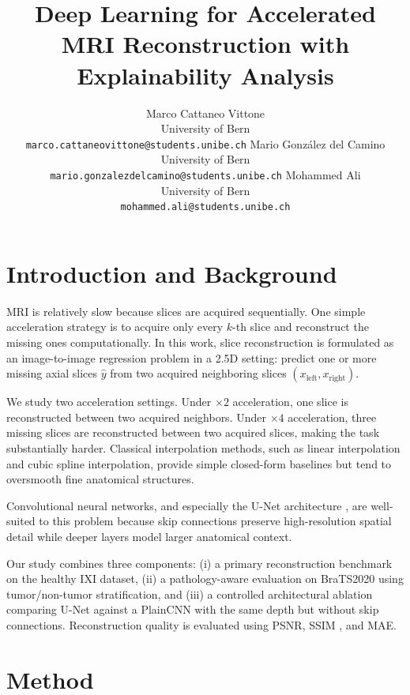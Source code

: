 \documentclass{article}
\title{Deep Learning for Accelerated MRI Reconstruction with Explainability Analysis}
\author{
  Marco Cattaneo Vittone \\
  University of Bern \\
  \texttt{marco.cattaneovittone@students.unibe.ch}
  \And
  Mario González del Camino \\
  University of Bern \\
  \texttt{mario.gonzalezdelcamino@students.unibe.ch}
  \And
  Mohammed Ali \\
  University of Bern \\
  \texttt{mohammed.ali@students.unibe.ch}
}
\begin{document}
\maketitle

\vspace{0.5em}
\section{Introduction and Background}

MRI is relatively slow because slices are acquired sequentially. One simple
acceleration strategy is to acquire only every \(k\)-th slice and reconstruct
the missing ones computationally. In this work, slice reconstruction is formulated as an image-to-image regression problem in a 2.5D setting: predict one or more missing axial slices \(\hat{y}\) from two acquired neighboring slices \((x_{\text{left}}, x_{\text{right}})\).

We study two acceleration settings. Under \( \times 2 \) acceleration, one slice is reconstructed between two acquired neighbors. Under \( \times 4 \) acceleration, three missing slices are reconstructed between two acquired slices, making the task substantially harder. Classical interpolation methods, such as linear interpolation and cubic spline interpolation, provide simple closed-form baselines but tend to oversmooth fine anatomical structures. 

Convolutional neural networks, and especially the U-Net architecture \cite{ronneberger2015unet}, are well-suited to this problem because skip connections preserve high-resolution spatial detail while deeper layers model larger anatomical context.

Our study combines three components: (i) a primary reconstruction benchmark on the healthy IXI dataset, (ii) a pathology-aware evaluation on BraTS2020 \cite{bakas2017brats} using tumor/non-tumor stratification, and (iii) a controlled architectural ablation comparing U-Net against a PlainCNN with the same depth but without skip connections. Reconstruction quality is evaluated using PSNR, SSIM \cite{wang2004ssim}, and MAE.

\section{Method}
\end{document}
